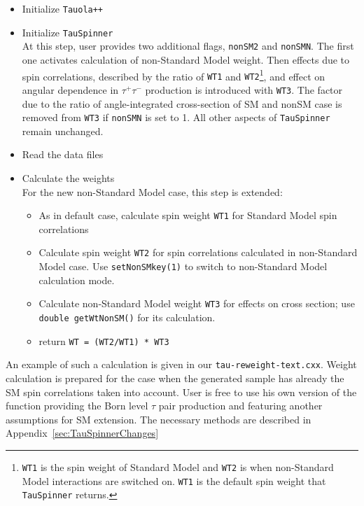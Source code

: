 \documentclass[12pt]{article}
\begin{document}
\begin{itemize}
\item Initialize {\tt Tauola++}
\item Initialize {\tt TauSpinner}\\
      At this step, user provides two additional flags, {\tt nonSM2} and
      {\tt nonSMN}. The first one activates calculation of non-Standard Model weight. 
     Then effects due to spin correlations, described by the ratio  of {\tt WT1} and {\tt WT2}\footnote{{\tt WT1} is the spin weight of Standard Model
      and {\tt WT2} is when non-Standard Model interactions are switched on. {\tt WT1} is the default spin weight that {\tt TauSpinner} returns.},
      and effect on angular dependence in $\tau^+\tau^-$ production is introduced with {\tt WT3}.
      The factor due to the ratio of angle-integrated cross-section of SM and nonSM case is removed from {\tt WT3} if {\tt nonSMN} is set to 1. 
      All other aspects of {\tt TauSpinner} remain unchanged. 
\item Read the data files
\item Calculate the weights \\
      For the new non-Standard Model case, this step is extended:
      \begin{itemize}
        \item As in default case, calculate spin weight {\tt WT1} for Standard Model spin correlations
        \item Calculate spin weight {\tt WT2} for spin correlations calculated in non-Standard Model case.
              Use {\tt setNonSMkey(1)} to switch to non-Standard Model calculation mode.
        \item Calculate non-Standard Model weight {\tt WT3} for effects on cross section; 
                 use {\tt double getWtNonSM()} for its calculation.
        \item return {\tt WT = (WT2/WT1) * WT3}
      \end{itemize}
\end{itemize}

An example of such a calculation is given in our {\tt tau-reweight-text.cxx}.  
Weight calculation is prepared for the case when the generated sample has already the SM spin correlations taken into account.
User is free to use his own version of the function providing the Born level $\tau$ pair production and featuring another assumptions for SM extension. 
The necessary methods are described in Appendix~\ref{sec:TauSpinnerChanges} 
\end{document}

